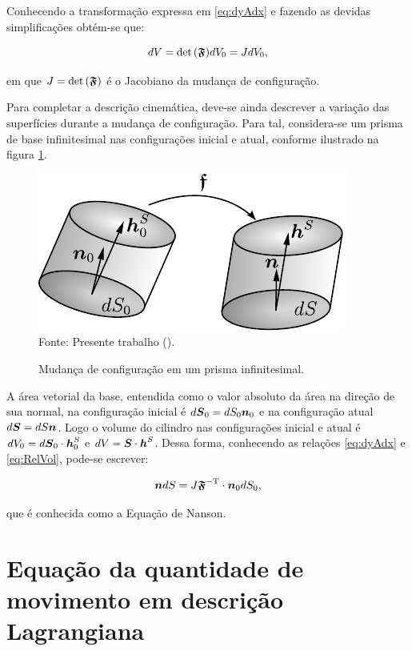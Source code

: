 Conhecendo a transformação expressa em \eqref{eq:dyAdx} e fazendo as devidas simplificações obtém-se que:

\begin{equation}
    dV=\det{(\boldsymbol{\mathfrak{F}})}dV_0=JdV_0\text{,}\label{eq:RelVol}
\end{equation}

\noindent em que $J=\det{(\boldsymbol{\mathfrak{F}})}$ é o Jacobiano da mudança de configuração.

Para completar a descrição cinemática, deve-se ainda descrever a variação das superfícies durante a mudança de configuração. Para tal, considera-se um prisma de base infinitesimal nas configurações inicial e atual, conforme ilustrado na figura \ref{fig:Nanson}.

\begin{figure}[h!]
    \centering
    \caption{Mudança de configuração em um prisma infinitesimal.}
    \includegraphics[width=.45\linewidth]{Figuras/Nanson.pdf}
    \\Fonte: Presente trabalho (\the\year).
    \label{fig:Nanson}
\end{figure}

A área vetorial da base, entendida como o valor absoluto da área na direção de sua normal, na configuração inicial é $d\boldsymbol{S}_0=dS_0\boldsymbol{n}_0$ e na configuração atual $d\boldsymbol{S}=dS\boldsymbol{n}$. Logo o volume do cilindro nas configurações inicial e atual é $dV_0=d\boldsymbol{S}_0\cdot\boldsymbol{h}^S_0$ e $dV=\boldsymbol{S}\cdot\boldsymbol{h}^S$. Dessa forma, conhecendo as relações \eqref{eq:dyAdx} e \eqref{eq:RelVol}, pode-se escrever:

\begin{equation}
    \boldsymbol{n}dS=J\boldsymbol{\mathfrak{F}}^\mathrm{-T}\cdot\boldsymbol{n}_0dS_0\text{,}\label{eq:Nanson}
\end{equation}

\noindent que é conhecida como a Equação de Nanson.

\section{Equação da quantidade de movimento em descrição Lagrangiana} \label{EqQuantMov}

